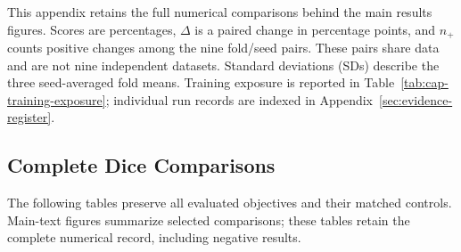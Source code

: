 \documentclass[12pt,a4paper]{article}
\begin{document}
This appendix retains the full numerical comparisons behind the main
results figures. Scores are percentages, $\Delta$ is a paired change in
percentage points, and $n_+$ counts positive changes among the nine
fold/seed pairs. These pairs share data and are not nine independent
datasets. Standard deviations (SDs) describe the three seed-averaged fold
means. Training exposure is reported in
Table~\ref{tab:cap-training-exposure}; individual run records are indexed
in Appendix~\ref{sec:evidence-register}.

\subsection{Complete Dice Comparisons}\label{sec:complete-result-tables}
The following tables preserve all evaluated objectives and their matched
controls. Main-text figures summarize selected comparisons; these tables
retain the complete numerical record, including negative results.
\end{document}
